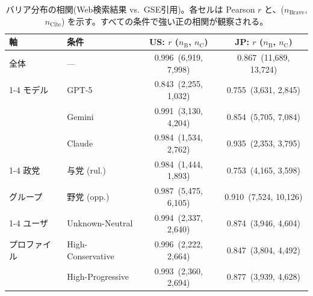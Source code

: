 \begin{table}[t]
\centering
\footnotesize
\setlength{\tabcolsep}{4pt}
\caption{バリア分布の相関(Web検索結果 vs.\ GSE引用)。各セルは Pearson $r$ と、($n_\text{Brave}$, $n_\text{Cite}$) を示す。すべての条件で強い正の相関が観察される。}
\label{tab:brave-citation-correlation}
\begin{tabular}{llcc}
\toprule
\textbf{軸} & \textbf{条件} & \textbf{US: $r$ ($n_\text{B}$, $n_\text{C}$)} & \textbf{JP: $r$ ($n_\text{B}$, $n_\text{C}$)} \\
\midrule
全体 & --- & 0.996\, (6{,}919, 7{,}998) & 0.867\, (11{,}689, 13{,}724) \\
\cmidrule(lr){1-4}
モデル & GPT-5 & 0.843\, (2{,}255, 1{,}032) & 0.755\, (3{,}631, 2{,}845) \\
 & Gemini & 0.991\, (3{,}130, 4{,}204) & 0.854\, (5{,}705, 7{,}084) \\
 & Claude & 0.984\, (1{,}534, 2{,}762) & 0.935\, (2{,}353, 3{,}795) \\
\cmidrule(lr){1-4}
政党 & 与党 (rul.) & 0.984\, (1{,}444, 1{,}893) & 0.753\, (4{,}165, 3{,}598) \\
グループ & 野党 (opp.) & 0.987\, (5{,}475, 6{,}105) & 0.910\, (7{,}524, 10{,}126) \\
\cmidrule(lr){1-4}
ユーザ & Unknown-Neutral & 0.994\, (2{,}337, 2{,}640) & 0.874\, (3{,}946, 4{,}604) \\
プロファイル & High-Conservative & 0.996\, (2{,}222, 2{,}664) & 0.847\, (3{,}804, 4{,}492) \\
 & High-Progressive & 0.993\, (2{,}360, 2{,}694) & 0.877\, (3{,}939, 4{,}628) \\
\bottomrule
\end{tabular}
\end{table}
